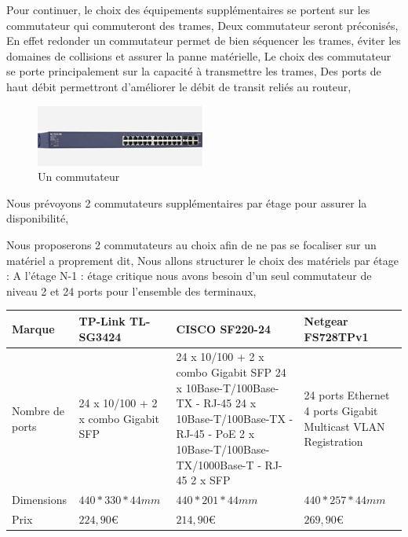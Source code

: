 Pour continuer, le choix des équipements supplémentaires se portent sur les commutateur qui commuteront des trames, Deux commutateur seront préconisés, En effet redonder un commutateur permet de bien séquencer les trames, éviter les domaines de collisions et assurer la panne matérielle,
Le choix des commutateur se porte principalement sur la capacité à transmettre les trames, Des ports de haut débit permettront d'améliorer le débit de transit reliés au routeur,

\begin{figure}[!ht]
    \center
    \includegraphics[width=0.5\textwidth]{./images/10.png}
    \caption{Un commutateur}
\end{figure}

Nous prévoyons 2 commutateurs supplémentaires par étage pour assurer la disponibilité,

Nous proposerons 2 commutateurs au choix afin de ne pas se focaliser sur un matériel a proprement dit,
Nous allons structurer le choix des matériels par étage :
A l'étage N-1 : étage critique nous avons  besoin d'un seul commutateur de niveau 2 et 24 ports pour l'ensemble des terminaux,


    \begin{center}
        \begin{tabular}{|l|p{4cm}|p{4cm}|p{4cm}|}
          \hline
            Marque  &  TP-Link TL-SG3424 &   CISCO SF220-24 &  Netgear FS728TPv1 \\
          \hline

Nombre de ports
  &   24 x 10/100 + 2 x combo Gigabit SFP
    &   24 x 10/100 + 2 x combo Gigabit SFP
24 x 10Base-T/100Base-TX - RJ-45
24 x 10Base-T/100Base-TX - RJ-45 - PoE
2 x 10Base-T/100Base-TX/1000Base-T - RJ-45
2 x SFP  & 24 ports Ethernet
4 ports Gigabit
Multicast VLAN Registration \\
          \hline
            Dimensions  &   $440 * 330 * 44 mm $                       &   $440 * 201 * 44 mm$ & $440 * 257 * 44 mm$                 \\
          \hline
            Prix  &
$224,90 \euro   $
    &
$214,90  \euro   $
 &
$269,90  \euro   $
 \\
          \hline
        \end{tabular}
    \end{center}

